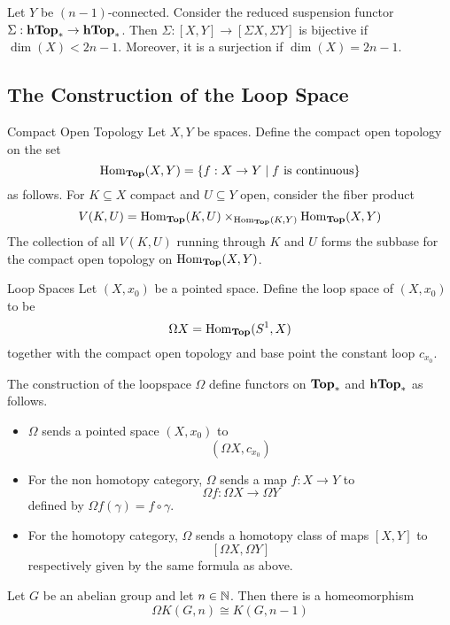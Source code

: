 \documentclass[a4paper]{article}
\begin{document}
\begin{thm}{}{} Let $Y$ be $(n-1)$-connected. Consider the reduced suspension functor $\Sigma:\bold{hTop}_\ast\to\bold{hTop}_\ast$. Then $\Sigma:[X,Y]\to[\Sigma X,\Sigma Y]$ is bijective if $\dim(X)<2n-1$. Moreover, it is a surjection if $\dim(X)=2n-1$. 
\end{thm}

\subsection{The Construction of the Loop Space}
\begin{defn}{Compact Open Topology}{} Let $X,Y$ be spaces. Define the compact open topology on the set $$\operatorname{Hom}_\bold{Top}(X,Y)=\{f:X\to Y\;|\;f\text{ is continuous}\}$$ as follows. For $K\subseteq X$ compact and $U\subseteq Y$ open, consider the fiber product $$V(K,U)=\operatorname{Hom}_\bold{Top}(K,U)\times_{\operatorname{Hom}_\bold{Top}(K,Y)}\operatorname{Hom}_\bold{Top}(X,Y)$$ The collection of all $V(K,U)$ running through $K$ and $U$ forms the subbase for the compact open topology on $\operatorname{Hom}_\bold{Top}(X,Y)$. 
\end{defn}

\begin{defn}{Loop Spaces}{} Let $(X,x_0)$ be a pointed space. Define the loop space of $(X,x_0)$ to be $$\Omega X=\operatorname{Hom}_\bold{Top}(S^1,X)$$ together with the compact open topology and base point the constant loop $c_{x_0}$. 
\end{defn}

\begin{thm}{}{} The construction of the loopspace $\Omega$ define functors on $\bold{Top}_\ast$ and $\bold{hTop}_\ast$ as follows. 
\begin{itemize}
\item $\Omega$ sends a pointed space $(X,x_0)$ to $$(\Omega X,c_{x_0})$$
\item For the non homotopy category, $\Omega$ sends a map $f:X\to Y$ to $$\Omega f:\Omega X\to\Omega Y$$ defined by $\Omega f(\gamma)=f\circ\gamma$. 
\item For the homotopy category, $\Omega$ sends a homotopy class of maps $[X,Y]$ to $$[\Omega X,\Omega Y]$$ respectively given by the same formula as above. 
\end{itemize}
\end{thm}

\begin{lmm}{}{} Let $G$ be an abelian group and let $n\in\mathbb{N}$. Then there is a homeomorphism $$\Omega K(G,n)\cong K(G,n-1)$$
\end{lmm}
\end{document}
